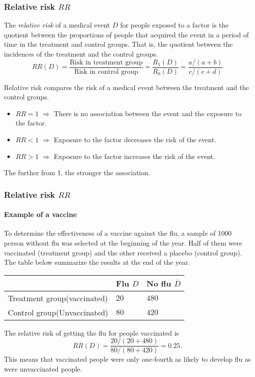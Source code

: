 \begin{frame}
\frametitle{Relative risk $RR$}
\begin{definition}
The \emph{relative risk} of a medical event $D$ for people exposed to a factor is the quotient between the proportions of people that acquired the event in a period of time in the treatment and control groups.
That is, the quotient between the incidences of the treatment and the control groups.
\[
  RR(D)=\frac{\mbox{Risk in treatment group}}{\mbox{Risk in control group}}=\frac{R_1(D)}{R_0(D)}=\frac{a/(a+b)}{c/(c+d)}
\]
\end{definition}

Relative risk compares the risk of a medical event between the treatment and the control groups. 
\begin{itemize}
  \item $RR=1$ $\Rightarrow$ There is no association between the event and the exposure to the factor. 
  \item $RR<1$ $\Rightarrow$ Exposure to the factor decreases the risk of the event.
  \item $RR>1$ $\Rightarrow$ Exposure to the factor increases the risk of the event.
\end{itemize}
The further from 1, the stronger the association. 
\end{frame}


\begin{frame}
\frametitle{Relative risk $RR$}
\framesubtitle{Example of a vaccine}
To determine the effectiveness of a vaccine against the flu, a sample of 1000 person without flu was selected at the beginning of the year.
Half of them were vaccinated (treatment group) and the other received a placebo (control group).
The table below summarize the results at the end of the year. 

\begin{center}
  \begin{tabular}{|m{2.7cm}|m{1.5cm}<{\centering}|m{1.5cm}<{\centering}|}
  \cline{2-3}
  \multicolumn{1}{c|}{} & Flu $D$ & No flu $\overline D$\\ 
  \hline
  Treatment group\newline (vaccinated) & $20$ & $480$\\ 
  \hline 
  Control group\newline (Unvaccinated) & $80$ & $420$\\ 
  \hline
\end{tabular}
\end{center}

The relative risk of getting the flu for people vaccinated is
\[
  RR(D) = \frac{20/(20+480)}{80/(80+420)} = 0.25.
\]
This means that vaccinated people were only one-fourth as likely to develop flu as were unvaccinated people.
\end{frame}


